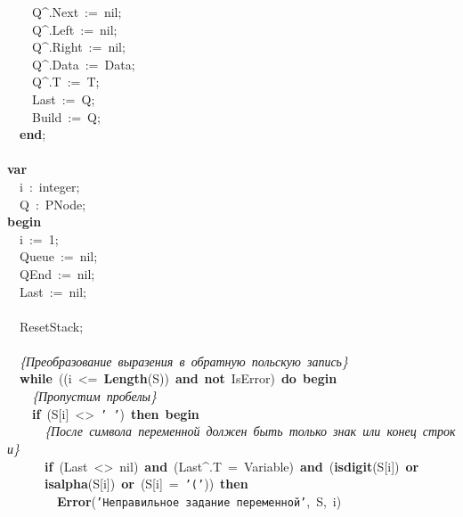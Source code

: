 \mbox{}\ \ \ \ Q\textasciicircum{}.Next\ :=\ nil; \\
\mbox{}\ \ \ \ Q\textasciicircum{}.Left\ :=\ nil; \\
\mbox{}\ \ \ \ Q\textasciicircum{}.Right\ :=\ nil; \\
\mbox{}\ \ \ \ Q\textasciicircum{}.Data\ :=\ Data; \\
\mbox{}\ \ \ \ Q\textasciicircum{}.T\ :=\ T; \\
\mbox{}\ \ \ \ Last\ :=\ Q; \\
\mbox{}\ \ \ \ Build\ :=\ Q; \\
\mbox{}\ \ \textbf{end}; \\
\mbox{} \\
\mbox{}\textbf{var} \\
\mbox{}\ \ i\ :\ integer; \\
\mbox{}\ \ Q\ :\ PNode; \\
\mbox{}\textbf{begin} \\
\mbox{}\ \ i\ :=\ 1; \\
\mbox{}\ \ Queue\ :=\ nil; \\
\mbox{}\ \ QEnd\ :=\ nil; \\
\mbox{}\ \ Last\ :=\ nil; \\
\mbox{} \\
\mbox{}\ \ ResetStack; \\
\mbox{} \\
\mbox{}\ \ \textit{\{Преобразование\ выразения\ в\ обратную\ польскую\ запись\}} \\
\mbox{}\ \ \textbf{while}\ ((i\ \textless{}=\ \textbf{Length}(S))\ \textbf{and}\ \textbf{not}\ IsError)\ \textbf{do}\ \textbf{begin} \\
\mbox{}\ \ \ \ \textit{\{Пропустим\ пробелы\}} \\
\mbox{}\ \ \ \ \textbf{if}\ (S[i]\ \textless{}\textgreater{}\ \texttt{'\ '})\ \textbf{then}\ \textbf{begin} \\
\mbox{}\ \ \ \ \ \ \textit{\{После\ символа\ переменной\ должен\ быть\ только\ знак\ или\ конец\ строки\}} \\
\mbox{}\ \ \ \ \ \ \textbf{if}\ (Last\ \textless{}\textgreater{}\ nil)\ \textbf{and}\ (Last\textasciicircum{}.T\ =\ Variable)\ \textbf{and}\ (\textbf{isdigit}(S[i])\ \textbf{or} \\
\mbox{}\ \ \ \ \ \ \textbf{isalpha}(S[i])\ \textbf{or}\ (S[i]\ =\ \texttt{'('}))\ \textbf{then} \\
\mbox{}\ \ \ \ \ \ \ \ \textbf{Error}(\texttt{'Неправильное\ задание\ переменной'},\ S,\ i) \\
